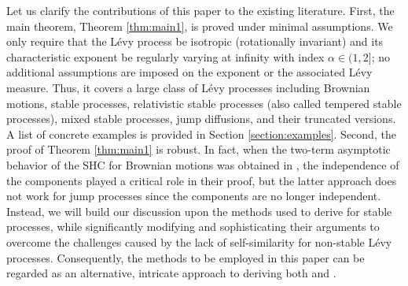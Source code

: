 \documentclass[11pt]{article}
\begin{document}
\begin{doublespace}
Let us clarify the contributions of this paper to the existing literature. First, the main theorem, Theorem \ref{thm:main1}, is proved under minimal assumptions. We only require that the L\'evy process be isotropic (rotationally invariant) and its characteristic exponent be regularly varying at infinity with index $\alpha\in (1,2]$; no additional assumptions are imposed on the exponent or the associated L\'evy measure. Thus, it covers a large class of L\'evy processes including Brownian motions, stable processes, relativistic stable processes (also called tempered stable processes), mixed stable processes, jump diffusions, and their truncated versions. A list of concrete examples is provided in Section \ref{section:examples}. 
Second, the proof of Theorem \ref{thm:main1} is robust. In fact, when the two-term asymptotic behavior of the SHC for Brownian motions was obtained in \cite[Theorem 6.2]{vdBD89}, the independence of the components played a critical role in their proof, but the latter approach does not work for jump processes since the components are no longer independent. Instead, we will build our discussion upon the methods used to derive \cite[Theorem 1.1]{PS22} for stable processes, while significantly modifying and sophisticating their arguments to overcome the challenges caused by the lack of self-similarity for non-stable L\'evy processes. Consequently, the methods to be employed in this paper can be regarded as an alternative, intricate approach to deriving both \cite[Theorem 6.2]{vdBD89} and \cite[Theorem 1.1]{PS22}. 


\end{doublespace}
\end{document}
